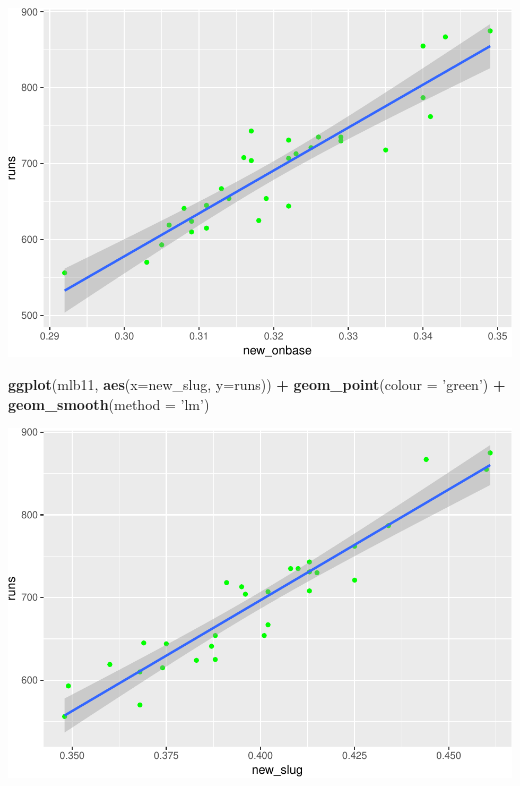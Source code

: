 \documentclass[]{article}
\newenvironment{Shaded}{\begin{snugshade}}{\end{snugshade}}
\newcommand{\KeywordTok}[1]{\textcolor[rgb]{0.13,0.29,0.53}{\textbf{#1}}}
\newcommand{\DataTypeTok}[1]{\textcolor[rgb]{0.13,0.29,0.53}{#1}}
\newcommand{\StringTok}[1]{\textcolor[rgb]{0.31,0.60,0.02}{#1}}
\newcommand{\OperatorTok}[1]{\textcolor[rgb]{0.81,0.36,0.00}{\textbf{#1}}}
\newcommand{\NormalTok}[1]{#1}
\begin{document}
\includegraphics{DATA_606_Lab_7_files/figure-latex/unnamed-chunk-3-1.pdf}

\begin{Shaded}
\begin{Highlighting}[]
\KeywordTok{ggplot}\NormalTok{(mlb11, }\KeywordTok{aes}\NormalTok{(}\DataTypeTok{x=}\NormalTok{new_slug, }\DataTypeTok{y=}\NormalTok{runs)) }\OperatorTok{+}
\StringTok{  }\KeywordTok{geom_point}\NormalTok{(}\DataTypeTok{colour =} \StringTok{'green'}\NormalTok{) }\OperatorTok{+}
\StringTok{  }\KeywordTok{geom_smooth}\NormalTok{(}\DataTypeTok{method =} \StringTok{'lm'}\NormalTok{)}
\end{Highlighting}
\end{Shaded}

\includegraphics{DATA_606_Lab_7_files/figure-latex/unnamed-chunk-3-2.pdf}
\end{document}

